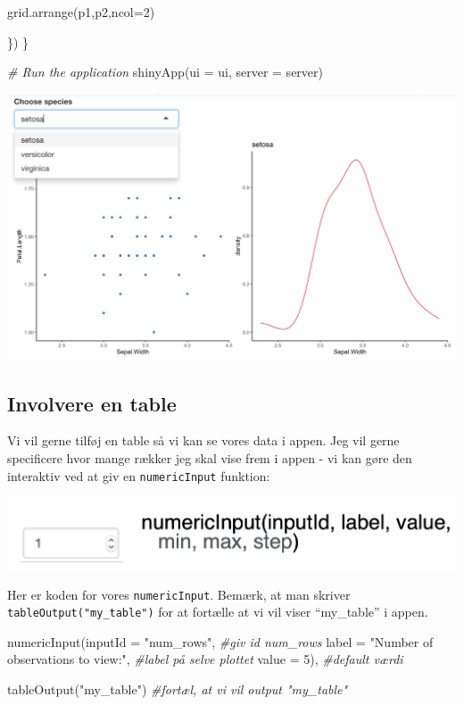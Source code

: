 \documentclass[
]{book}
\newenvironment{Shaded}{\begin{snugshade}}{\end{snugshade}}
\newcommand{\AttributeTok}[1]{\textcolor[rgb]{0.77,0.63,0.00}{#1}}
\newcommand{\CommentTok}[1]{\textcolor[rgb]{0.56,0.35,0.01}{\textit{#1}}}
\newcommand{\DecValTok}[1]{\textcolor[rgb]{0.00,0.00,0.81}{#1}}
\newcommand{\FunctionTok}[1]{\textcolor[rgb]{0.00,0.00,0.00}{#1}}
\newcommand{\NormalTok}[1]{#1}
\newcommand{\StringTok}[1]{\textcolor[rgb]{0.31,0.60,0.02}{#1}}
\begin{document}
\begin{Shaded}
\begin{Highlighting}[]
        \FunctionTok{grid.arrange}\NormalTok{(p1,p2,}\AttributeTok{ncol=}\DecValTok{2}\NormalTok{)}
        
\NormalTok{    \})}
\NormalTok{\}}

\CommentTok{\# Run the application }
\FunctionTok{shinyApp}\NormalTok{(}\AttributeTok{ui =}\NormalTok{ ui, }\AttributeTok{server =}\NormalTok{ server)}
\end{Highlighting}
\end{Shaded}

\includegraphics[width=0.75\linewidth]{plots/shiny_two}

\hypertarget{involvere-en-table}{%
\subsection{Involvere en table}\label{involvere-en-table}}

Vi vil gerne tilføj en table så vi kan se vores data i appen. Jeg vil gerne specificere hvor mange rækker jeg skal vise frem i appen - vi kan gøre den interaktiv ved at giv en \texttt{numericInput} funktion:

\includegraphics[width=0.4\linewidth]{plots/numericInput}

Her er koden for vores \texttt{numericInput}. Bemærk, at man skriver \texttt{tableOutput("my\_table")} for at fortælle at vi vil viser ``my\_table'' i appen.

\begin{Shaded}
\begin{Highlighting}[]
\FunctionTok{numericInput}\NormalTok{(}\AttributeTok{inputId =} \StringTok{"num\_rows"}\NormalTok{,                           }\CommentTok{\#giv id num\_rows}
                 \AttributeTok{label =} \StringTok{"Number of observations to view:"}\NormalTok{,  }\CommentTok{\#label på selve plottet}
                 \AttributeTok{value =} \DecValTok{5}\NormalTok{),                                 }\CommentTok{\#default værdi}

\FunctionTok{tableOutput}\NormalTok{(}\StringTok{"my\_table"}\NormalTok{)                                      }\CommentTok{\#fortæl, at vi vil output "my\_table"}
\end{Highlighting}
\end{Shaded}
\end{document}
